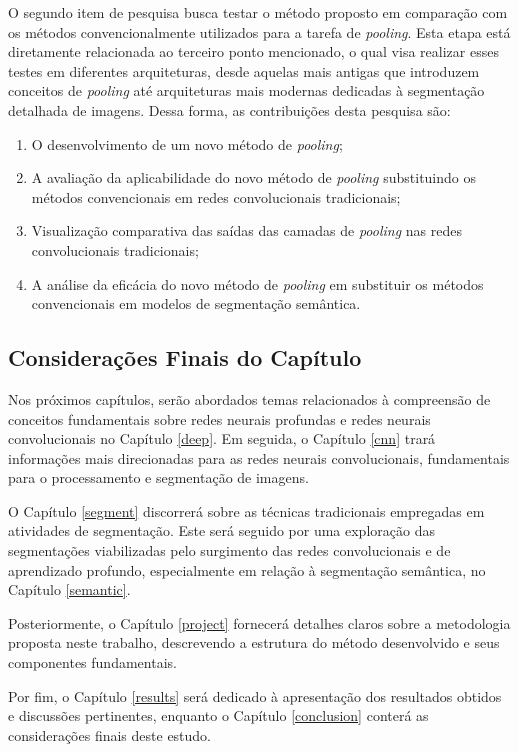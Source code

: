 O segundo item de pesquisa busca testar o método proposto em comparação com os métodos convencionalmente utilizados para a tarefa de \textit{pooling}. Esta etapa está diretamente relacionada ao terceiro ponto mencionado, o qual visa realizar esses testes em diferentes arquiteturas, desde aquelas mais antigas que introduzem conceitos de \textit{pooling} até arquiteturas mais modernas dedicadas à segmentação detalhada de imagens. Dessa forma, as contribuições desta pesquisa são:

\begin{enumerate}
    \item O desenvolvimento de um novo método de \textit{pooling};
    \item A avaliação da aplicabilidade do novo método de \textit{pooling} substituindo os métodos convencionais em redes convolucionais tradicionais;
    \item Visualização comparativa das saídas das camadas de \textit{pooling} nas redes convolucionais tradicionais;
    \item A análise da eficácia do novo método de \textit{pooling} em substituir os métodos convencionais em modelos de segmentação semântica.
\end{enumerate}


\subsection{Considerações Finais do Capítulo}
\label{intro:end}
Nos próximos capítulos, serão abordados temas relacionados à compreensão de conceitos fundamentais sobre redes neurais profundas e redes neurais convolucionais no Capítulo \ref{deep}. Em seguida, o Capítulo \ref{cnn} trará informações mais direcionadas para as redes neurais convolucionais, fundamentais para o processamento e segmentação de imagens.

O Capítulo \ref{segment} discorrerá sobre as técnicas tradicionais empregadas em atividades de segmentação. Este será seguido por uma exploração das segmentações viabilizadas pelo surgimento das redes convolucionais e de aprendizado profundo, especialmente em relação à segmentação semântica, no Capítulo \ref{semantic}.

Posteriormente, o Capítulo \ref{project} fornecerá detalhes claros sobre a metodologia proposta neste trabalho, descrevendo a estrutura do método desenvolvido e seus componentes fundamentais.

Por fim, o Capítulo \ref{results} será dedicado à apresentação dos resultados obtidos e discussões pertinentes, enquanto o Capítulo \ref{conclusion} conterá as considerações finais deste estudo.

